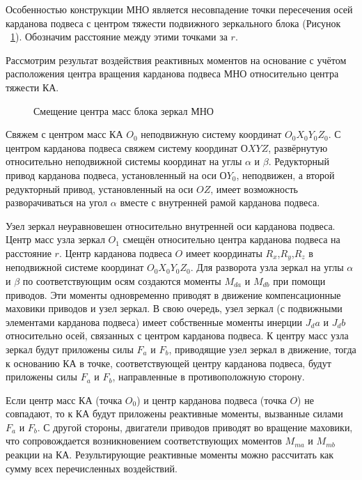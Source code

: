 Особенностью конструкции МНО является несовпадение точки пересечения осей карданова подвеса с центром тяжести подвижного зеркального блока (Рисунок ~\cref{fig:tikz_YPK}).
Обозначим расстояние между этими точками за $r$. 

Рассмотрим результат воздействия реактивных моментов на основание с учётом расположения центра вращения карданова подвеса МНО относительно центра тяжести КА.
\begin{figure}[ht]
	\legend{}
	\caption[Пример \texttt{tikz} схемы]{Смещение центра масс блока зеркал МНО}\label{fig:tikz_YPK}
\end{figure}

Свяжем с центром масс КА $O_0$  неподвижную систему координат $O_0X_0Y_0Z_0$. С центром карданова подвеса свяжем систему координат $ОXYZ$, развёрнутую относительно неподвижной системы координат на углы $\alpha$ и $\beta$. Редукторный привод карданова подвеса, установленный на оси $ОY_0$, неподвижен, а второй редукторный привод, установленный на оси $OZ$, имеет возможность разворачиваться на угол $\alpha$ вместе с внутренней рамой карданова подвеса. 

Узел зеркал неуравновешен относительно внутренней оси карданова подвеса. Центр масс узла зеркал $O_1$ смещён относительно центра карданова подвеса на расстояние $r$. Центр карданова подвеса $O$ имеет координаты $R_x$,$R_y$,$R_z$ в неподвижной системе координат $O_0X_0Y_0Z_0$. Для разворота узла зеркал на углы $\alpha$ и $\beta$ по соответствующим осям создаются моменты $M_{da}$ и $M_{db}$ при помощи приводов. Эти моменты одновременно приводят в движение компенсационные маховики приводов и узел зеркал. В свою очередь, узел зеркал (с подвижными элементами карданова подвеса) имеет собственные моменты инерции $J_da$ и $J_db$ относительно осей, связанных с центром карданова подвеса. К центру масс узла зеркал будут приложены силы $F_a$ и $F_b$, приводящие узел зеркал в движение, тогда к основанию КА в точке, соответствующей центру карданова подвеса, будут приложены силы $F_a$ и $F_b$, направленные в противоположную сторону.

Если центр масс КА (точка $O_0$) и центр карданова подвеса (точка $O$) не совпадают, то к КА будут приложены реактивные моменты, вызванные силами $F_a$ и $F_b$. С другой стороны, двигатели приводов приводят во вращение маховики, что сопровождается возникновением  соответствующих моментов $M_{ma}$ и $M_{mb}$ реакции на КА. Результирующие реактивные моменты можно рассчитать как сумму всех перечисленных воздействий.

